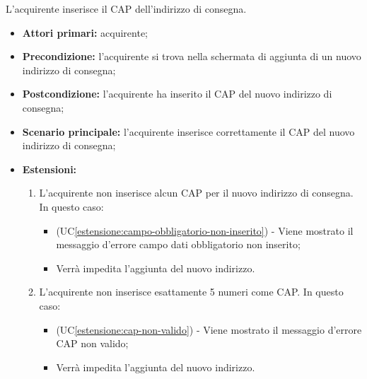 L'acquirente inserisce il CAP dell'indirizzo di consegna.
\begin{itemize}
    \item \textbf{Attori primari:} acquirente;
    \item \textbf{Precondizione:} l'acquirente si trova nella schermata di aggiunta di un nuovo indirizzo di consegna;
    \item \textbf{Postcondizione:} l'acquirente ha inserito il CAP del nuovo indirizzo di consegna;
    \item \textbf{Scenario principale:} l'acquirente inserisce correttamente il CAP del nuovo indirizzo di consegna;
    \item \textbf{Estensioni:}
    \begin{enumerate}[label=\lett]
        \item L'acquirente non inserisce alcun CAP per il nuovo indirizzo di consegna. In questo caso:
        \begin{itemize}
            \item (UC\ref{estensione:campo-obbligatorio-non-inserito}) - Viene mostrato il messaggio d'errore campo dati obbligatorio non inserito;
            \item Verrà impedita l'aggiunta del nuovo indirizzo.
        \end{itemize}
        \item L'acquirente non inserisce esattamente 5 numeri come CAP. In questo caso:
        \begin{itemize}
            \item (UC\ref{estensione:cap-non-valido}) - Viene mostrato il messaggio d'errore CAP non valido;
            \item Verrà impedita l'aggiunta del nuovo indirizzo.
        \end{itemize}
    \end{enumerate}
\end{itemize}


\label{modifica-indirizzo-consegna}

